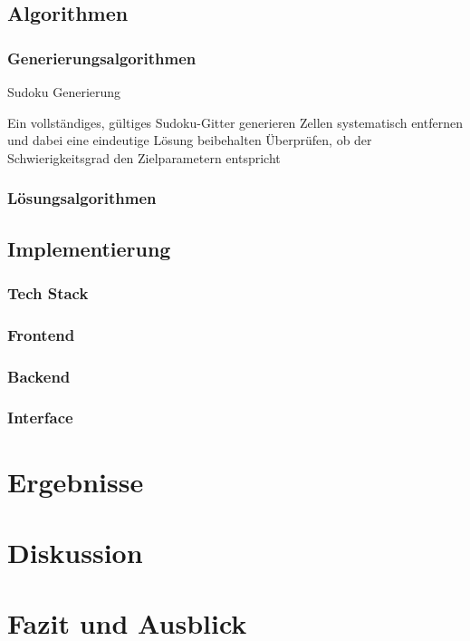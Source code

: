 \documentclass[12pt,a4paper]{article}
\begin{document}
\subsection{Algorithmen}
\subsubsection{Generierungsalgorithmen}
\begin{algorithm}
\caption{Sudoku Generierung}
\begin{algorithmic}[1]
\State Ein vollständiges, gültiges Sudoku-Gitter generieren
\State Zellen systematisch entfernen und dabei eine eindeutige Lösung beibehalten
\State Überprüfen, ob der Schwierigkeitsgrad den Zielparametern entspricht
\end{algorithmic}
\end{algorithm}

\subsubsection{Lösungsalgorithmen}

\subsection{Implementierung}
\subsubsection{Tech Stack}
\subsubsection{Frontend}
\subsubsection{Backend}
\subsubsection{Interface}

\section{Ergebnisse}

\section{Diskussion}

\section{Fazit und Ausblick}



\end{document}
